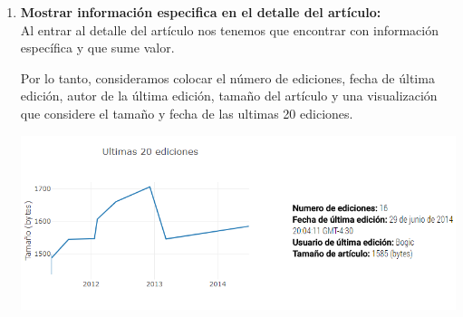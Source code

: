 \begin{enumerate}
  En donde \textbf{chartType} es para pasarle el tipo de gráfica que queremos desplegar, \textbf{chartX} y \textbf{chartY} correponde el set de datos para ambos ejes, \textbf{chartXTitle} y \textbf{chartYTitle} describe el título de ambos ejes y \textbf{chartTitle} hace referencia al título de la visualización.
  
  
  Se consideró hacer el componente de tal forma que fuera reactivo al cambio dimensión de la pantalla, es decir, las visualizaciones son responsive.
  
  \begin{verbatim}
  this.resizeService.onResize$.subscribe(() =>
    Plotly.Plots.resize(this.gd)
  );
  \end{verbatim}
  
  Haciendo uso del patrón observador, con ayuda de la biblioteca ReactiveX \footnote{\url{http://reactivex.io/}}, cada ves que la pantalla cambia su posición nos enteramos mediante un servicio y ajustamos el tamaño de la visualización.
  
  \item\textbf{Mostrar información especifica en el detalle del artículo:}\\

  Al entrar al detalle del artículo nos tenemos que encontrar con información específica y que sume valor.
  
  Por lo tanto, consideramos colocar el número de ediciones, fecha de última edición, autor de la última edición, tamaño del artículo y una visualización que considere el tamaño y fecha de las ultimas 20 ediciones.
  
  \begin{center}
      \bigbreak
      \includegraphics[scale=0.5]{images/marco_aplicativo/article_detail_main.png}
      \label{fig:article_detail_main}
      \bigbreak
  \end{center}
  

\end{enumerate}
